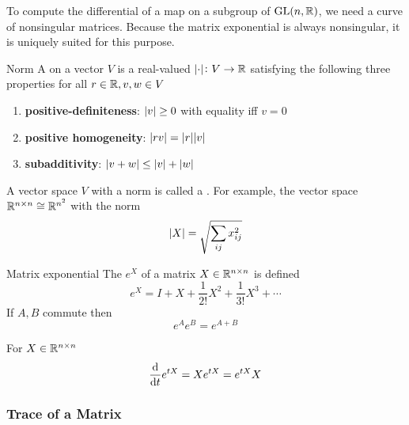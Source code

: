 To compute the differential of a map on a subgroup of \(\operatorname{GL}(n ,\mathbb{R})\), we need a curve of nonsingular matrices.
Because the matrix exponential is always nonsingular, it is uniquely suited for this purpose.
\begin{definition}{Norm}{}
    A  on a vector \(V\) is a real-valued \(\abs{\cdot}\colon V \rightarrow \mathbb{R}\) satisfying the following three properties for all \(r \in \mathbb{R}, v,w \in V\)
    \begin{enumerate}
        \item \textbf{positive-definiteness}: \(\abs{v} \geq 0\) with equality iff \(v = 0\)
        \item \textbf{positive homogeneity}: \(\abs{rv} = \abs{r}\abs{v}\)
        \item \textbf{subadditivity}: \(\abs{v+w} \leq \abs{v} + \abs{w}\)
    \end{enumerate}
    A vector space \(V\) with a norm is called a .
    For example, the vector space \(\mathbb{R}^{n \times n} \cong \mathbb{R}^{n^2}\) with the norm 
    \[
        \abs{X} = \sqrt{\sum_{ij} x_{ij}^2}  
    \]
\end{definition}
\begin{definition}{Matrix exponential}{}
    The  \(e^X\) of a matrix \(X \in \mathbb{R}^{n\times n}\) is defined 
    \[
        e^X = I + X + \frac{1}{2!}X^2 + \frac{1}{3!}X^3 + \cdots    
    \]
    If \(A, B\) commute then 
    \[
        e^A e^B = e^{A+B}    
    \]
\end{definition}
\begin{proposition}{}{}
    For \(X \in \mathbb{R}^{n \times n}\)
    \[
        \dv{t} e^{tX} = X e^{tX} = e^{tX} X    
    \]
\end{proposition}

\subsubsection{Trace of a Matrix}

